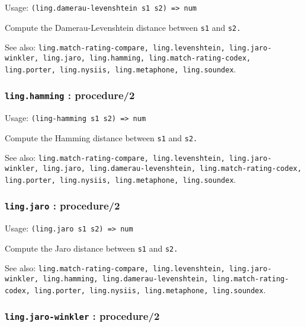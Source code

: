 \documentclass[
]{article}
\newcommand{\passthrough}[1]{#1}
\begin{document}
Usage: \passthrough{\lstinline!(ling.damerau-levenshtein s1 s2) => num!}

Compute the Damerau-Levenshtein distance between
\passthrough{\lstinline!s1!} and \passthrough{\lstinline!s2.!}

See also:
\passthrough{\lstinline!ling.match-rating-compare, ling.levenshtein, ling.jaro-winkler, ling.jaro, ling.hamming, ling.match-rating-codex, ling.porter, ling.nysiis, ling.metaphone, ling.soundex!}.

\hypertarget{ling.hamming-procedure2}{%
\subsubsection{\texorpdfstring{\texttt{ling.hamming} :
procedure/2}{ling.hamming : procedure/2}}\label{ling.hamming-procedure2}}

Usage: \passthrough{\lstinline!(ling-hamming s1 s2) => num!}

Compute the Hamming distance between \passthrough{\lstinline!s1!} and
\passthrough{\lstinline!s2.!}

See also:
\passthrough{\lstinline!ling.match-rating-compare, ling.levenshtein, ling.jaro-winkler, ling.jaro, ling.damerau-levenshtein, ling.match-rating-codex, ling.porter, ling.nysiis, ling.metaphone, ling.soundex!}.

\hypertarget{ling.jaro-procedure2}{%
\subsubsection{\texorpdfstring{\texttt{ling.jaro} :
procedure/2}{ling.jaro : procedure/2}}\label{ling.jaro-procedure2}}

Usage: \passthrough{\lstinline!(ling.jaro s1 s2) => num!}

Compute the Jaro distance between \passthrough{\lstinline!s1!} and
\passthrough{\lstinline!s2.!}

See also:
\passthrough{\lstinline!ling.match-rating-compare, ling.levenshtein, ling.jaro-winkler, ling.hamming, ling.damerau-levenshtein, ling.match-rating-codex, ling.porter, ling.nysiis, ling.metaphone, ling.soundex!}.

\hypertarget{ling.jaro-winkler-procedure2}{%
\subsubsection{\texorpdfstring{\texttt{ling.jaro-winkler} :
procedure/2}{ling.jaro-winkler : procedure/2}}\label{ling.jaro-winkler-procedure2}}
\end{document}
